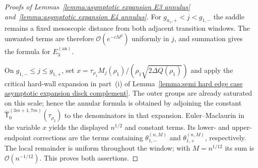 \documentclass[a4paper]{article}
\numberwithin{equation}{section}
\begin{document}
\begin{proof}[Proofs of Lemmas~\ref{lemma:asymptotic expansion E3 annulus}
and~\ref{lemma:asymptotic expansion E4 annulus}]
For $g_{a_1,+}<j<g_{1,-}$ the saddle remains a fixed mesoscopic distance from
both adjacent transition windows.  The unwanted terms are therefore
$\mathcal O(e^{-cM^2})$ uniformly in $j$, and summation gives the formula for
$E_3^{(\mathrm{an})}$.

On $g_{1,-}\le j\le g_{1,+}$, set
$x=\tau_{\rho_1}M_j(\rho_1)/(\rho_1\sqrt{2\Delta Q(\rho_1)})$ and apply the critical
hard-wall expansion in part~(i) of
Lemma~\ref{lemma:semi hard edge case asymptotic expansion disck complement}.
The outer groups are already saturated on this scale; hence the annular
formula is obtained by adjoining the constant
$\widehat{\mathsf T}_0^{(3m+1,7m)}(\tau_{\rho_2})$ to the denominators in
that expansion.  Euler--Maclaurin in the variable $x$ yields the displayed
$n^{1/2}$ and constant terms.  Its lower- and upper-endpoint corrections are
the terms containing $\theta_{1,-}^{(n,M)}$ and
$\theta_{1,+}^{(n,M)}$, respectively.  The local remainder is uniform
throughout the window; with $M=n^{1/12}$ its sum is
$\mathcal O(n^{-1/12})$.  This proves both assertions.
\end{proof}
\end{document}
